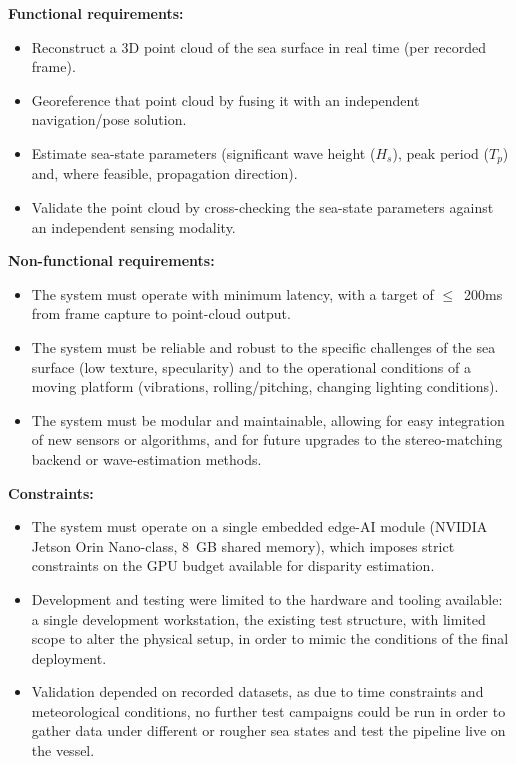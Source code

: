 \textbf{Functional requirements:}
\begin{itemize}
	\item Reconstruct a 3D point cloud of the sea surface in real time (per recorded frame).
	\item Georeference that point cloud by fusing it with an independent navigation/pose solution.
	\item Estimate sea-state parameters (significant wave height ($H_s$), peak period ($T_p$) and, where feasible, propagation direction).
	\item Validate the point cloud by cross-checking the sea-state parameters against an independent sensing modality.
\end{itemize}

\textbf{Non-functional requirements:}
\begin{itemize}
	\item The system must operate with minimum latency, with a target of $\leq$\, 200ms from frame capture to point-cloud output.
	\item The system must be reliable and robust to the specific challenges of the sea surface (low texture, specularity) and to the operational conditions of a moving platform (vibrations, rolling/pitching, changing lighting conditions).
	\item The system must be modular and maintainable, allowing for easy integration of new sensors or algorithms, and for future upgrades to the stereo-matching backend or wave-estimation methods.
\end{itemize}

\textbf{Constraints:}
\begin{itemize}
	\item \begin{sloppypar}The system must operate on a single embedded edge-AI module (NVIDIA Jetson Orin Nano-class, 8~GB shared memory), which imposes strict constraints on the GPU budget available for disparity estimation.\end{sloppypar}
	\item Development and testing were limited to the hardware and tooling available: a single development workstation, the existing test structure, with limited scope to alter the physical setup, in order to mimic the conditions of the final deployment.
	\item Validation depended on recorded datasets, as due to time constraints and meteorological conditions, no further test campaigns could be run in order to gather data under different or rougher sea states and test the pipeline live on the vessel.
\end{itemize}
